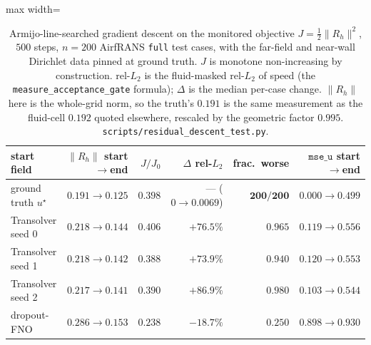 \begin{table}[t]
\centering
\small
\caption{Armijo-line-searched gradient descent on the monitored objective
$J=\tfrac12\|R_h\|^2$, $500$ steps, $n=200$ AirfRANS \texttt{full} test cases, with the
far-field and near-wall Dirichlet data pinned at ground truth. $J$ is monotone
non-increasing by construction. rel-$L_2$ is the fluid-masked rel-$L_2$ of speed (the
\texttt{measure\_acceptance\_gate} formula); $\Delta$ is the median per-case change.
$\|R_h\|$ here is the whole-grid norm, so the truth's $0.191$ is the same measurement as
the fluid-cell $0.192$ quoted elsewhere, rescaled by the geometric factor $0.995$.
\texttt{scripts/residual\_descent\_test.py}.}
\label{tab:descent200}
\begin{adjustbox}{max width=\textwidth}
\begin{tabular}{l r r r r r}
\toprule
start field & $\|R_h\|$ start$\to$end & $J/J_0$ & $\Delta$ rel-$L_2$ & frac.\ worse & $\texttt{mse\_u}$ start$\to$end \\
\midrule
ground truth $u^\star$ & $0.191\to0.125$ & $0.398$ & --- ($0\to0.0069$) & $\mathbf{200/200}$ & $0.000\to0.499$ \\
Transolver seed 0      & $0.218\to0.144$ & $0.406$ & $+76.5\%$ & $0.965$ & $0.119\to0.556$ \\
Transolver seed 1      & $0.218\to0.142$ & $0.388$ & $+73.9\%$ & $0.940$ & $0.120\to0.553$ \\
Transolver seed 2      & $0.217\to0.141$ & $0.390$ & $+86.9\%$ & $0.980$ & $0.103\to0.544$ \\
dropout-FNO            & $0.286\to0.153$ & $0.238$ & $-18.7\%$ & $0.250$ & $0.898\to0.930$ \\
\bottomrule
\end{tabular}
\end{adjustbox}
\end{table}

